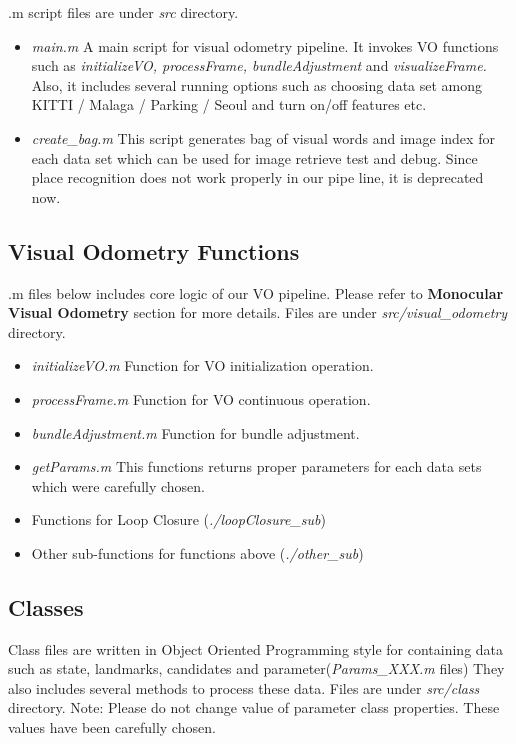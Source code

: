 .m script files are under \textit{src} directory. 

\begin{itemize}
\item \textit{main.m} \quad A main script for visual odometry pipeline. It invokes VO functions such as \textit{initializeVO, processFrame, bundleAdjustment} and \textit{visualizeFrame.} Also, it includes several running options such as choosing data set among KITTI / Malaga / Parking / Seoul and turn on/off features etc.

\item \textit{create\_bag.m} \quad This script generates bag of visual words and image index for each data set which can be used for image retrieve test and debug. Since place recognition does not work properly in our pipe line, it is deprecated now.
\end{itemize}

\subsection*{Visual Odometry Functions}

.m files below includes core logic of our VO pipeline. Please refer to \textbf{Monocular Visual Odometry} section for more details. Files are under \textit{src/visual\_odometry} directory.

\begin{itemize}
\item \textit{initializeVO.m} \quad Function for VO initialization operation.  
\item \textit{processFrame.m} \quad Function for VO continuous operation.
\item \textit{bundleAdjustment.m} \quad Function for bundle adjustment.
\item \textit{getParams.m} \quad This functions returns proper parameters for each data sets which were carefully chosen.
\item Functions for Loop Closure (\textit{./loopClosure\_sub}) 
\item Other sub-functions for functions above (\textit{./other\_sub})
\end{itemize}

\subsection*{Classes}

Class files are written in Object Oriented Programming style for containing data such as state, landmarks, candidates and parameter(\textit{Params\_XXX.m} files) They also includes several methods to process these data. Files are under \textit{src/class} directory.\newline \newline
Note: Please do not change value of parameter class properties. These values have been carefully chosen. 

